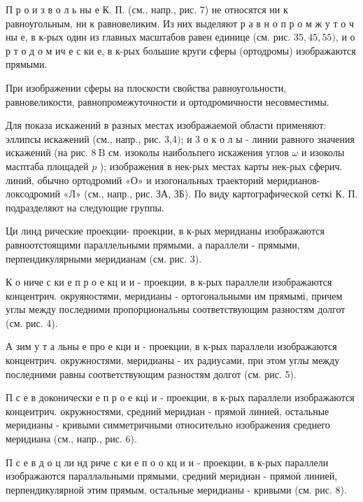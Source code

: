 \documentclass[10pt]{article}
\begin{document}
П р о и з в о л ь ны е К. П. (см., напр., рис. 7) не относятся ни к равноугольным, ни к равновеликим. Из них выделяют р а в н о п р о м ж у т о ч ны е, в к-рых один из главных масштабов равен единице (см. рис. $35,45,55)$, и о р т о д о м ич е с ки е, в к-рых большие круги сферы (ортодромы) изображаются прямыми.



При изображении сферы на плоскости свойства равноугольности, равновеликости, равнопромежуточности и ортодромичности несовместимы.



Для показа искажений в разных местах изображаемой области применяют: эллипсы искажений (см., напр., рис. 3,4$)$; и 3 о к о л ы - линии равного значения искажений (на рис. $8 \mathrm{~B}$ см. изоколы наибольпего искажения углов $\omega$ и изоколы масптаба площадей $p$ ); изображения в нек-рых местах карты нек-рых сферич. линий, обычно ортодромий «О» и изогональных траекторий меридианов-локсодромий «Л» (см., напр., рис. ЗА, ЗБ). По виду картографической сеткі К. П. подразделяют на следующие группы.



Ци линд рические проекции- проекции, в к-рых меридианы изображаются равноотстоящими параллельными прямыми, а параллели - прямыми, перпендикулярными меридианам (см. рис. 3).



К о ниче с ки е п р о е кц и и - проекции, в к-рых параллели изображаются концентрич. окруяностями, меридианы - ортогональными им прямымі, причем углы между последними пропорциональны соответствующим разностям долгот (см. рис. 4).



А зим у т а льны е про е кци и - проекции, в к-рых параллели изображаются концентрич. окружностями, меридианы - их радиусами, при этом углы между последними равны соответствующим разностям долгот (см. рис. 5).



П с е в доконически е п р о е кці и - проекции, в к-рых параллели изображаются концеитрич. окружностями, средний меридиан - прямой линией, остальные меридианы - кривыми симметричными относительно изображения среднего меридиана (см., напр., рис. 6).



П с е в д о ц ли нд риче с ки е п о о кц и и - проекции, в к-рых параллели изображаются паралләльными прямыми, средний меридиан - прямоӥ линией, перпендикулярной этим прямым, остальные меридианы - кривыми (см. рис. 8).
\end{document}
